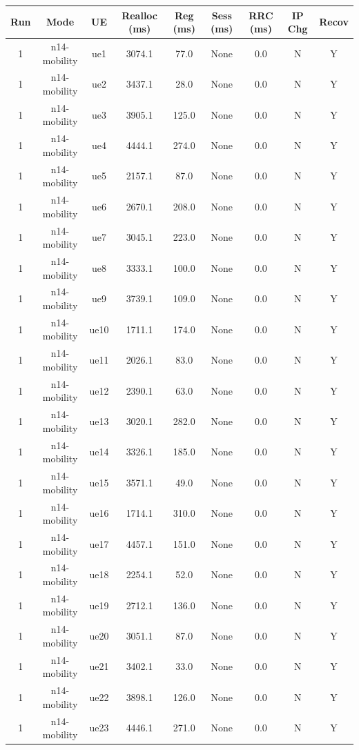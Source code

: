 \begin{table}[ht]
\centering
\begin{tabular}{|c|c|c|c|c|c|c|c|c|}
\hline
Run & Mode & UE & Realloc (ms) & Reg (ms) & Sess (ms) & RRC (ms) & IP Chg & Recov \\
\hline
1 & n14-mobility & ue1 & 3074.1 & 77.0 & None & 0.0 & N & Y \\
1 & n14-mobility & ue2 & 3437.1 & 28.0 & None & 0.0 & N & Y \\
1 & n14-mobility & ue3 & 3905.1 & 125.0 & None & 0.0 & N & Y \\
1 & n14-mobility & ue4 & 4444.1 & 274.0 & None & 0.0 & N & Y \\
1 & n14-mobility & ue5 & 2157.1 & 87.0 & None & 0.0 & N & Y \\
1 & n14-mobility & ue6 & 2670.1 & 208.0 & None & 0.0 & N & Y \\
1 & n14-mobility & ue7 & 3045.1 & 223.0 & None & 0.0 & N & Y \\
1 & n14-mobility & ue8 & 3333.1 & 100.0 & None & 0.0 & N & Y \\
1 & n14-mobility & ue9 & 3739.1 & 109.0 & None & 0.0 & N & Y \\
1 & n14-mobility & ue10 & 1711.1 & 174.0 & None & 0.0 & N & Y \\
1 & n14-mobility & ue11 & 2026.1 & 83.0 & None & 0.0 & N & Y \\
1 & n14-mobility & ue12 & 2390.1 & 63.0 & None & 0.0 & N & Y \\
1 & n14-mobility & ue13 & 3020.1 & 282.0 & None & 0.0 & N & Y \\
1 & n14-mobility & ue14 & 3326.1 & 185.0 & None & 0.0 & N & Y \\
1 & n14-mobility & ue15 & 3571.1 & 49.0 & None & 0.0 & N & Y \\
1 & n14-mobility & ue16 & 1714.1 & 310.0 & None & 0.0 & N & Y \\
1 & n14-mobility & ue17 & 4457.1 & 151.0 & None & 0.0 & N & Y \\
1 & n14-mobility & ue18 & 2254.1 & 52.0 & None & 0.0 & N & Y \\
1 & n14-mobility & ue19 & 2712.1 & 136.0 & None & 0.0 & N & Y \\
1 & n14-mobility & ue20 & 3051.1 & 87.0 & None & 0.0 & N & Y \\
1 & n14-mobility & ue21 & 3402.1 & 33.0 & None & 0.0 & N & Y \\
1 & n14-mobility & ue22 & 3898.1 & 126.0 & None & 0.0 & N & Y \\
1 & n14-mobility & ue23 & 4446.1 & 271.0 & None & 0.0 & N & Y \\

\end{tabular}
\end{table}
